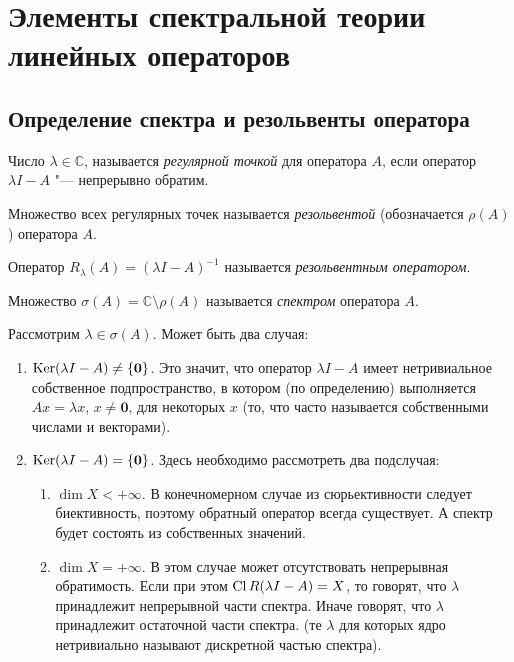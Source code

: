 \section{Элементы спектральной теории линейных операторов}

\subsection{Определение спектра и резольвенты оператора}

\begin{definition}
    Число $\lambda \in \mathbb{C}$, называется \textit{регулярной точкой}
    для оператора $A$, если оператор $\lambda I - A$ "--- непрерывно обратим.
\end{definition}

\begin{definition}[резольвента]
    Множество всех регулярных точек называется \textit{резольвентой} (обозначается $\rho(A)$)
    оператора $A$.
\end{definition}

\begin{definition}
    Оператор $R_\lambda(A) = \left( \lambda I - A\right)^{-1}$ называется 
    \textit{резольвентным оператором}.
\end{definition}

\begin{definition}[спектр]
    Множество $\sigma(A) = \mathbb{C} \setminus \rho(A)$ называется 
    \textit{спектром} оператора $A$.
\end{definition}

Рассмотрим $\lambda \in \sigma(A)$. Может быть два случая:
\begin{enumerate}
    \item
    $\operatorname{Ker} (\lambda I - A) \neq \left\{ \boldsymbol{0}\right\}$. Это значит, что оператор 
    $\lambda I - A$ имеет нетривиальное собственное подпространство, в котором (по определению)
    выполняется $Ax=\lambda x$, $x \neq \boldsymbol{0}$, для некоторых $x$
    (то, что часто называется собственными числами и векторами).
    \item
    $\operatorname{Ker} (\lambda I - A) = \left\{ \boldsymbol{0}\right\}$. 
    Здесь необходимо рассмотреть два подслучая:
    \begin{enumerate}
        \item
        $\dim X < +\infty$. В конечномерном случае из сюрьективности следует
        биективность, поэтому обратный оператор всегда существует.
        А спектр будет состоять из собственных значений.
        \item
        $\dim X = +\infty$. В этом случае может отсутствовать непрерывная обратимость.
        Если при этом $\operatorname{Cl} R(\lambda I - A) = X$, то говорят, что $\lambda$ 
        принадлежит непрерывной части спектра. Иначе говорят, что
        $\lambda$ принадлежит остаточной части спектра.
        (те $\lambda$ для которых ядро нетривиально называют дискретной частью спектра).
    \end{enumerate}
\end{enumerate}

